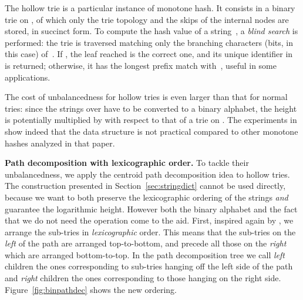 \documentclass[a4paper,11pt]{article}
\newcommand{\ttlpar}[1]{\noindent\textbf{#1}}
\theoremstyle{nonumberplain}
\begin{document}
The hollow trie \cite{monotonehash09} is a particular instance of
monotone hash. It consists in a binary trie on , of which
only the trie topology and the skips of the internal nodes are stored,
in succinct form. To compute the hash value of a string~, a \emph{blind
  search} is performed: the trie is traversed matching only the
branching characters (bits, in this case) of~. If , the leaf reached is the correct one, and its unique
identifier in  is returned; otherwise, it has the
longest prefix match with~, useful in some applications.

The cost of unbalancedness for hollow tries is even larger than that
for normal tries: since the strings over  have to be converted
to a binary alphabet, the height is potentially multiplied by  with respect to that of a trie on . The
experiments in \cite{monotonehash09} show indeed that the data
structure is not practical compared to other monotone hashes
analyzed in that paper.


\ttlpar{Path decomposition with lexicographic order.}
To tackle their unbalancedness, we apply the centroid path
decomposition idea to hollow tries. The construction presented in
Section~\ref{sec:stringdict} cannot be used directly, because we want 
to both preserve the lexicographic ordering of the strings \emph{and} 
guarantee the logarithmic height. However
both the binary alphabet and the fact that we do not need the
 operation come to the aid.
First, inspired again by \cite{pods08}, we arrange the sub-tries in
\emph{lexicographic} order. This means that the sub-tries on the
\emph{left} of the path are arranged top-to-bottom, and precede all
those on the \emph{right} which are arranged bottom-to-top. In the
path decomposition tree we call \emph{left} children the ones
corresponding to sub-tries hanging off the left side of the path and
\emph{right} children the ones corresponding to those hanging on the
right side. Figure~\ref{fig:binpathdec} shows the new ordering.
\end{document}
